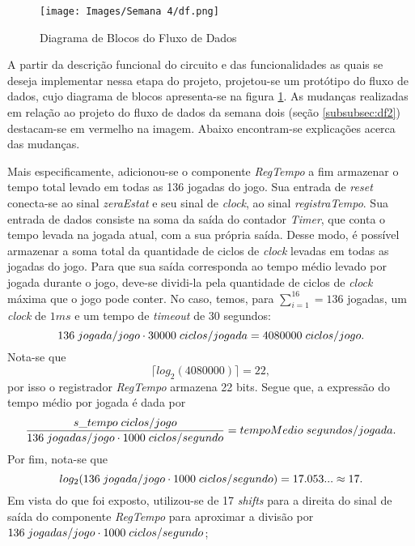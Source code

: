 \documentclass[amsmath,amssymb,floatfix]{report}
\begin{document}
\begin{figure}[H]
    \centering
    \texttt{[image: Images/Semana 4/df.png]}
    \caption{Diagrama de Blocos do Fluxo de Dados}
    \label{fig:df4}
\end{figure}

A partir da descrição funcional do circuito e das funcionalidades as quais se deseja implementar nessa etapa do projeto, projetou-se um protótipo do fluxo de dados, cujo diagrama de blocos apresenta-se na figura \ref{fig:df4}. As mudanças realizadas em relação ao projeto do fluxo de dados da semana dois (seção \ref{subsubsec:df2}) destacam-se em vermelho na imagem. Abaixo encontram-se explicações acerca das mudanças.

Mais especificamente, adicionou-se o componente \textit{RegTempo} a fim armazenar o tempo total levado em todas as 136 jogadas do jogo. Sua entrada de \textit{reset} conecta-se ao sinal \textit{zeraEstat} e seu sinal de \textit{clock}, ao sinal \textit{registraTempo}. Sua entrada de dados consiste na soma da saída do contador \textit{Timer}, que conta o tempo levada na jogada atual, com a sua própria saída. Desse modo, é possível armazenar a soma total da quantidade de ciclos de \textit{clock} levadas em todas as jogadas do jogo. Para que sua saída corresponda ao tempo médio levado por jogada durante o jogo, deve-se dividi-la pela quantidade de ciclos de \textit{clock} máxima que o jogo pode conter. No caso, temos, para $\sum_{i=1}^{16}=136$ jogadas, um \textit{clock} de $1ms$ e um tempo de \textit{timeout} de $30$ segundos:$$136\hspace{1mm}jogada/jogo \cdot 30000\hspace{1mm}ciclos/jogada = 4080000 \hspace{1mm} ciclos/jogo.$$ Nota-se que $$\lceil log_2(4080000) \rceil = 22,$$ por isso o registrador \textit{RegTempo} armazena 22 bits. Segue que, a expressão do tempo médio por jogada é dada por $$\frac{s\_tempo\hspace{1mm}ciclos/jogo}{136\hspace{1mm}jogadas/jogo \cdot 1000\hspace{1mm}ciclos/segundo} = tempoMedio\hspace{1mm}segundos/jogada.$$ Por fim, nota-se que $$log_2(136\hspace{1mm}jogada/jogo \cdot 1000\hspace{1mm}ciclos/segundo) = 17.053... \approx 17.$$ Em vista do que foi exposto, utilizou-se de 17 \textit{shifts} para a direita do sinal de saída do componente \textit{RegTempo} para aproximar a divisão por $136\hspace{1mm}jogadas/jogo \cdot 1000\hspace{1mm}ciclos/segundo$;
\end{document}
